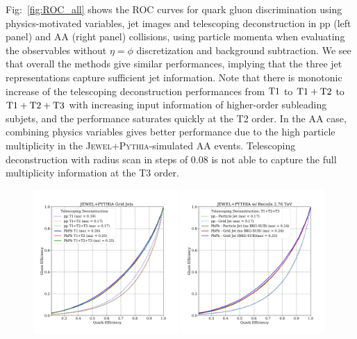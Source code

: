 \documentclass[notoc]{JHEP3}
\newcommand{\jwpy}{\textsc{Jewel+Pythia}}
\begin{document}
Fig:~\ref{fig:ROC_all} shows the ROC curves for quark gluon discrimination using physics-motivated variables, jet images and telescoping deconstruction in pp (left panel) and AA (right panel) collisions, using particle momenta when evaluating the observables without $\eta=\phi$ discretization and background subtraction. We see that overall the methods give similar performances, implying that the three jet representations capture sufficient jet information. Note that there is monotonic increase of the telescoping deconstruction performances from $\rm T1$ to $\rm T1+T2$ to $\rm T1+T2+T3$ with increasing input information of higher-order subleading subjets, and the performance saturates quickly at the T2 order. In the AA case, combining physics variables gives better performance due to the high particle multiplicity in the \jwpy-simulated AA events. Telescoping deconstruction with radius scan in steps of 0.08 is not able to capture the full multiplicity information at the T3 order.

\begin{figure}
	   \centering
       \includegraphics[width=0.49\textwidth]{plots/JEWELPYTHIA_TD_2p76TeV_ppvsPbPb.pdf}
       \includegraphics[width=0.49\textwidth]{plots/JEWELPYTHIA_TD123_2p76TeV_ppvsPbPb_comp_QvsG.pdf}
	   \caption{}
\label{fig:ROC_TD_input}
\end{figure}
\end{document}
